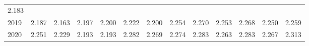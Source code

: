 \begin{tabular}{lllllllllllll}
  \multicolumn{1}{r}{2.183} \\
\multicolumn{1}{l}{\hspace{1em}2019} &
  \multicolumn{1}{|r}{2.187} &
  \multicolumn{1}{r}{2.163} &
  \multicolumn{1}{r}{2.197} &
  \multicolumn{1}{r}{2.200} &
  \multicolumn{1}{r}{2.222} &
  \multicolumn{1}{r}{2.200} &
  \multicolumn{1}{r}{2.254} &
  \multicolumn{1}{r}{2.270} &
  \multicolumn{1}{r}{2.253} &
  \multicolumn{1}{r}{2.268} &
  \multicolumn{1}{r}{2.250} &
  \multicolumn{1}{r}{2.259} \\
\multicolumn{1}{l}{\hspace{1em}2020} &
  \multicolumn{1}{|r}{2.251} &
  \multicolumn{1}{r}{2.229} &
  \multicolumn{1}{r}{2.193} &
  \multicolumn{1}{r}{2.193} &
  \multicolumn{1}{r}{2.282} &
  \multicolumn{1}{r}{2.269} &
  \multicolumn{1}{r}{2.274} &
  \multicolumn{1}{r}{2.283} &
  \multicolumn{1}{r}{2.263} &
  \multicolumn{1}{r}{2.283} &
  \multicolumn{1}{r}{2.267} &
  \multicolumn{1}{r}{2.313} \\
\cline{1-13}
\end{tabular}
